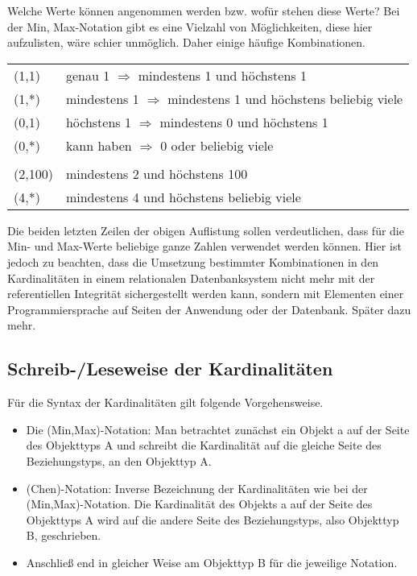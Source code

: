          Welche Werte können angenommen werden bzw. wofür stehen diese Werte? Bei der Min, Max-Notation gibt es eine Vielzahl von Möglichkeiten, diese hier aufzulisten, wäre schier unmöglich. Daher einige häufige Kombinationen.
\clearpage
          \begin{supertabular}[ht]{lp{11cm}}
            (1,1) & genau 1 $\Longrightarrow$ mindestens 1 und höchstens 1\\
            (1,*) & mindestens 1 $\Longrightarrow$ mindestens 1 und höchstens beliebig viele\\
            (0,1) & höchstens 1 $\Longrightarrow$ mindestens 0 und höchstens 1\\
            (0,*) & kann haben $\Longrightarrow$ 0 oder beliebig viele\\
            \\
            (2,100) & mindestens 2 und höchstens 100\\
            (4,*) & mindestens 4 und höchstens beliebig viele\\
          \end{supertabular}

          Die beiden letzten Zeilen der obigen Auflistung sollen verdeutlichen, dass für die Min- und Max-Werte beliebige ganze Zahlen verwendet werden können. Hier ist jedoch zu beachten, dass die Umsetzung bestimmter Kombinationen in den Kardinalitäten in einem relationalen Datenbanksystem nicht mehr mit der referentiellen Integrität sichergestellt werden kann, sondern mit Elementen einer Programmiersprache auf Seiten der Anwendung oder der Datenbank. Später dazu mehr.
          \subsection{Schreib-/Leseweise der Kardinalitäten}
          Für die Syntax der Kardinalitäten gilt folgende Vorgehensweise.
          \begin{itemize}
            \item Die (Min,Max)-Notation: Man betrachtet zunächst ein Objekt a auf der Seite des Objekttyps A und schreibt die Kardinalität auf die gleiche Seite des Beziehungstyps, an den Objekttyp A.
            \item (Chen)-Notation: Inverse Bezeichnung der Kardinalitäten wie bei der (Min,Max)-Notation. Die Kardinalität des Objekts a auf der Seite des Objekttyps A wird auf die andere Seite des Beziehungstyps, also Objekttyp B, geschrieben.
            \item Anschließ end in gleicher Weise am Objekttyp B für die jeweilige Notation.
          \end{itemize}
